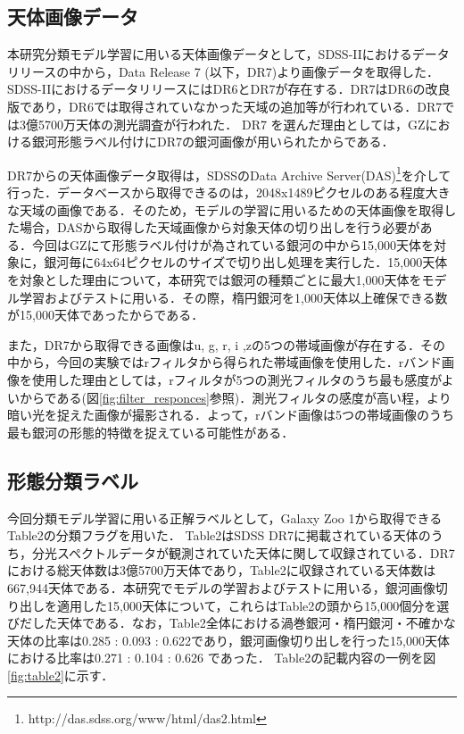 \documentclass[a4j, 11pt]{jreport}
\begin{document}
\subsection{天体画像データ}
本研究分類モデル学習に用いる天体画像データとして，SDSS-IIにおけるデータリリースの中から，Data Release 7 (以下，DR7)\cite{Abazajian2009}より画像データを取得した．SDSS-IIにおけるデータリリースにはDR6とDR7が存在する．DR7はDR6の改良版であり，DR6では取得されていなかった天域の追加等が行われている．DR7では3億5700万天体の測光調査が行われた．
DR7 を選んだ理由としては，GZにおける銀河形態ラベル付けにDR7の銀河画像が用いられたからである．

DR7からの天体画像データ取得は，SDSSのData Archive Server(DAS)\footnote{http://das.sdss.org/www/html/das2.html}を介して行った．データベースから取得できるのは，2048x1489ピクセルのある程度大きな天域の画像である．そのため，モデルの学習に用いるための天体画像を取得した場合，DASから取得した天域画像から対象天体の切り出しを行う必要がある．今回はGZにて形態ラベル付けが為されている銀河の中から15,000天体を対象に，銀河毎に64x64ピクセルのサイズで切り出し処理を実行した．15,000天体を対象とした理由について，本研究では銀河の種類ごとに最大1,000天体をモデル学習およびテストに用いる．その際，楕円銀河を1,000天体以上確保できる数が15,000天体であったからである．

また，DR7から取得できる画像はu, g, r, i ,zの5つの帯域画像が存在する．その中から，今回の実験ではrフィルタから得られた帯域画像を使用した．rバンド画像を使用した理由としては，rフィルタが5つの測光フィルタのうち最も感度がよいからである(図\ref{fig:filter_responces}参照)．測光フィルタの感度が高い程，より暗い光を捉えた画像が撮影される．よって，rバンド画像は5つの帯域画像のうち最も銀河の形態的特徴を捉えている可能性がある．

\subsection{形態分類ラベル}
今回分類モデル学習に用いる正解ラベルとして，Galaxy Zoo 1から取得できるTable2の分類フラグを用いた．
Table2はSDSS DR7に掲載されている天体のうち，分光スペクトルデータが観測されていた天体に関して収録されている．DR7における総天体数は3億5700万天体であり，Table2に収録されている天体数は667,944天体である．本研究でモデルの学習およびテストに用いる，銀河画像切り出しを適用した15,000天体について，これらはTable2の頭から15,000個分を選びだした天体である．なお，Table2全体における渦巻銀河・楕円銀河・不確かな天体の比率は0.285 : 0.093 : 0.622であり，銀河画像切り出しを行った15,000天体における比率は0.271 : 0.104 : 0.626 であった．
Table2の記載内容の一例を図\ref{fig:table2}に示す．
\end{document}
